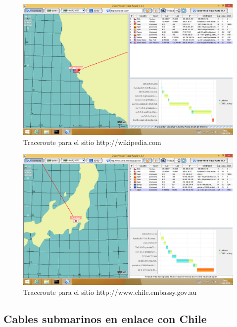 \documentclass{article}
\begin{document}
\begin{figure}[H]
    \centering
    \includegraphics[scale=0.27]{wiki}
    \caption{Traceroute para el sitio http://wikipedia.com}
\end{figure}

\begin{figure}[H]
    \centering
    \includegraphics[scale=0.27]{embajada}
    \caption{Traceroute para el sitio http://www.chile.embassy.gov.au}
\end{figure}


\subsection{Cables submarinos en enlace con Chile}
\end{document}
